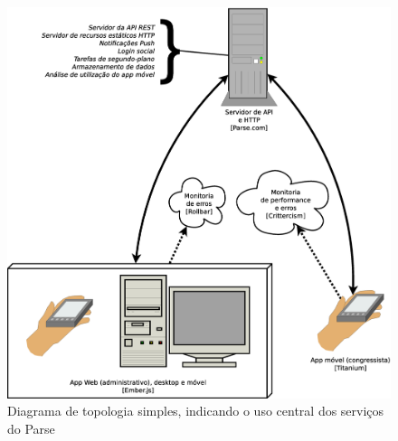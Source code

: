 \documentclass[a4paper]{abntex2}
\begin{document}
\begin{figure}[h!]
\centering
	\includegraphics[width=0.8\linewidth]{diagramas/topologia-parse.eps}
	\caption{Diagrama de topologia simples, indicando o uso central dos serviços do Parse}
\end{figure}


\printbibliography
\end{document}
